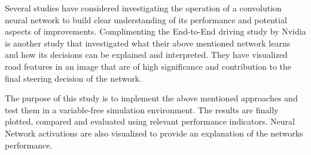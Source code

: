 Several studies have considered investigating the operation of a convolution neural network to build clear understanding of its performance and potential aspects of improvements\cite{viz}. Complimenting the End-to-End driving study by Nvidia is another study \cite{nvidia_activ} \cite{visualbackprop} that investigated what their above mentioned network learns and how its decisions can be explained and interpreted. They have visualized road features in an image that are of high significance and contribution to the final steering decision of the network.

The purpose of this study is to implement the above mentioned approaches and test them in a variable-free simulation environment. The results are finally plotted, compared and evaluated using relevant performance indicators. Neural Network activations are also visualized to provide an explanation of the networks performance.

